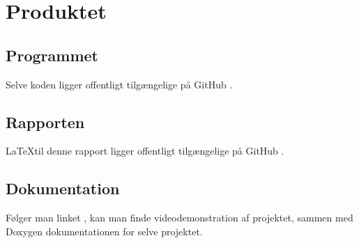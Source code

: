 \chapter{Produktet}
\label{chapter:final-product}

\section{Programmet}
\label{sec:the-program}
Selve koden ligger offentligt tilgængelige på GitHub \cite{the-project}.

\section{Rapporten}
\label{sec:the-report}
\LaTeX til denne rapport ligger offentligt tilgængelige på GitHub \cite{the-report}.

\section{Dokumentation}
\label{sec:the-documentation}
Følger man linket \cite{the-auxiliary}, kan man finde videodemonstration af projektet, sammen med Doxygen dokumentationen for selve projektet. 
